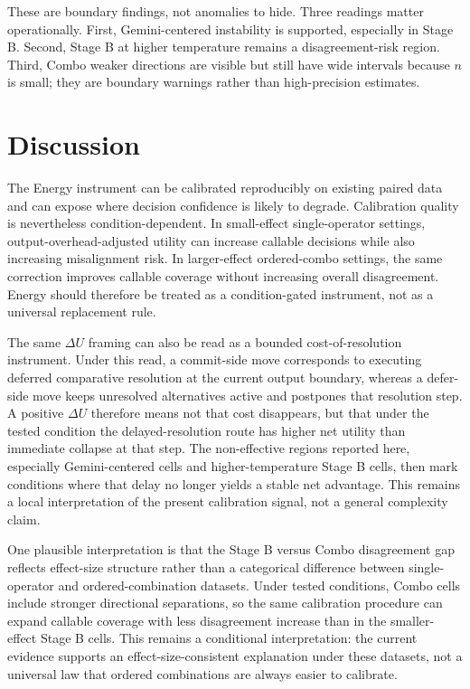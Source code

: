 \documentclass[11pt,a4paper]{article}
\begin{document}
These are boundary findings, not anomalies to hide. Three readings matter operationally. First, Gemini-centered instability is supported, especially in Stage B. Second, Stage B at higher temperature remains a disagreement-risk region. Third, Combo weaker directions are visible but still have wide intervals because $n$ is small; they are boundary warnings rather than high-precision estimates.

\section{Discussion}
\label{sec:discussion}

The Energy instrument can be calibrated reproducibly on existing paired data and can expose where decision confidence is likely to degrade. Calibration quality is nevertheless condition-dependent. In small-effect single-operator settings, output-overhead-adjusted utility can increase callable decisions while also increasing misalignment risk. In larger-effect ordered-combo settings, the same correction improves callable coverage without increasing overall disagreement. Energy should therefore be treated as a condition-gated instrument, not as a universal replacement rule.

The same $\Delta U$ framing can also be read as a bounded cost-of-resolution instrument. Under this read, a commit-side move corresponds to executing deferred comparative resolution at the current output boundary, whereas a defer-side move keeps unresolved alternatives active and postpones that resolution step. A positive $\Delta U$ therefore means not that cost disappears, but that under the tested condition the delayed-resolution route has higher net utility than immediate collapse at that step. The non-effective regions reported here, especially Gemini-centered cells and higher-temperature Stage B cells, then mark conditions where that delay no longer yields a stable net advantage. This remains a local interpretation of the present calibration signal, not a general complexity claim.

One plausible interpretation is that the Stage B versus Combo disagreement gap reflects effect-size structure rather than a categorical difference between single-operator and ordered-combination datasets. Under tested conditions, Combo cells include stronger directional separations, so the same calibration procedure can expand callable coverage with less disagreement increase than in the smaller-effect Stage B cells. This remains a conditional interpretation: the current evidence supports an effect-size-consistent explanation under these datasets, not a universal law that ordered combinations are always easier to calibrate.
\end{document}
